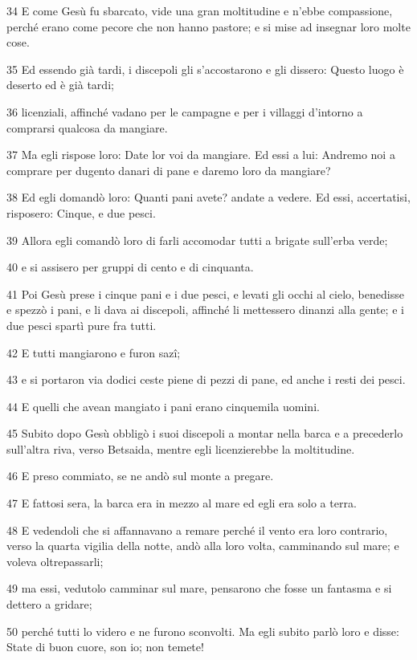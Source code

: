 \par 34 E come Gesù fu sbarcato, vide una gran moltitudine e n'ebbe compassione, perché erano come pecore che non hanno pastore; e si mise ad insegnar loro molte cose.
\par 35 Ed essendo già tardi, i discepoli gli s'accostarono e gli dissero: Questo luogo è deserto ed è già tardi;
\par 36 licenziali, affinché vadano per le campagne e per i villaggi d'intorno a comprarsi qualcosa da mangiare.
\par 37 Ma egli rispose loro: Date lor voi da mangiare. Ed essi a lui: Andremo noi a comprare per dugento danari di pane e daremo loro da mangiare?
\par 38 Ed egli domandò loro: Quanti pani avete? andate a vedere. Ed essi, accertatisi, risposero: Cinque, e due pesci.
\par 39 Allora egli comandò loro di farli accomodar tutti a brigate sull'erba verde;
\par 40 e si assisero per gruppi di cento e di cinquanta.
\par 41 Poi Gesù prese i cinque pani e i due pesci, e levati gli occhi al cielo, benedisse e spezzò i pani, e li dava ai discepoli, affinché li mettessero dinanzi alla gente; e i due pesci spartì pure fra tutti.
\par 42 E tutti mangiarono e furon sazî;
\par 43 e si portaron via dodici ceste piene di pezzi di pane, ed anche i resti dei pesci.
\par 44 E quelli che avean mangiato i pani erano cinquemila uomini.
\par 45 Subito dopo Gesù obbligò i suoi discepoli a montar nella barca e a precederlo sull'altra riva, verso Betsaida, mentre egli licenzierebbe la moltitudine.
\par 46 E preso commiato, se ne andò sul monte a pregare.
\par 47 E fattosi sera, la barca era in mezzo al mare ed egli era solo a terra.
\par 48 E vedendoli che si affannavano a remare perché il vento era loro contrario, verso la quarta vigilia della notte, andò alla loro volta, camminando sul mare; e voleva oltrepassarli;
\par 49 ma essi, vedutolo camminar sul mare, pensarono che fosse un fantasma e si dettero a gridare;
\par 50 perché tutti lo videro e ne furono sconvolti. Ma egli subito parlò loro e disse: State di buon cuore, son io; non temete!
